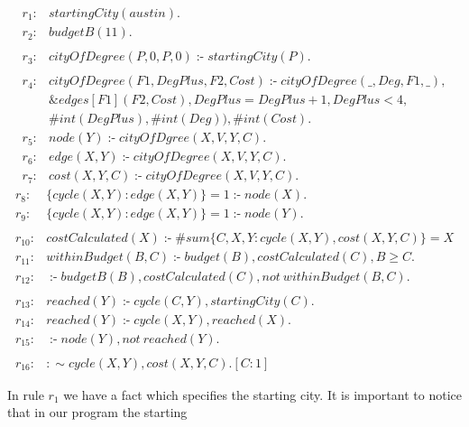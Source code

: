 \documentclass[a4paper, titlepage]{article}
\newcommand{\ext}[3]{\ensuremath{\&{#1}[#2](#3)}}
\DeclareMathOperator{\leftimpl}{:-}
\begin{document}
\begin{exmp}
\label{travellingsalesperson}
\begin{align*}
r_1\colon & startingCity(austin).\\
r_2\colon & budgetB(11).\\
\\
r_3\colon & \mathit{cityOfDegree(P,0,P,0)} \leftimpl 
\mathit{startingCity(P).} \\
& \\
r_4\colon & \mathit{cityOfDegree(F1, DegPlus, F2, Cost)} 
\leftimpl \mathit{cityOfDegree(\_, Deg, F1, \_)}, \\ 
&\ext{edges}{F1}{F2, Cost}, \mathit{DegPlus=DegPlus+1}, 
DegPlus < 4, \\ & \#int(DegPlus), \#int(Deg)), \#int(Cost). 
\\
r_5\colon& \mathit{node(Y)} \leftimpl 
\mathit{cityOfDgree(X, V, Y, C)}.\\
r_6\colon& \mathit{edge}(X, Y) \leftimpl 
\mathit{cityOfDegree(X, V, Y, C).} \\
r_7\colon & cost(X,Y,C) \leftimpl cityOfDegree(X, V, Y, C). 
\end{align*}
\begin{align*}
r_8 \colon & \{ cycle(X,Y) : edge(X,Y) \} = 1 \leftimpl 
node(X). \\
r_{9} \colon &  \{ cycle(X,Y) : edge(X,Y) \} = 1 \leftimpl 
node(Y). \\
& \\
r_{10} \colon & costCalculated(X) \leftimpl \#sum \{C,X,Y : 
cycle(X,Y), cost(X,Y,C)\} = X \\
r_{11} \colon & withinBudget(B,C) \leftimpl budget(B), 
costCalculated(C), B \geq C. \\
r_{12} \colon & \leftimpl  budgetB(B), costCalculated(C), 
\mathit{not} \ \mathit{withinBudget(B,C).} \\
& \\
r_{13} \colon & reached(Y) \leftimpl cycle(C, Y), startingCity(C). \\
r_{14} \colon & reached(Y) \leftimpl cycle(X,Y), 
reached(X). \\
r_{15} \colon & \leftimpl node(Y), \mathit{not} \ 
\mathit{reached(Y)}. \\
& \\
r_{16} \colon & :\sim cycle(X,Y), cost(X,Y,C). [C:1] 
\end{align*}
\end{exmp}
In rule $r_1$ we have a fact which specifies the starting 
city. 
It is important to notice that in our program the starting 
\end{document}

